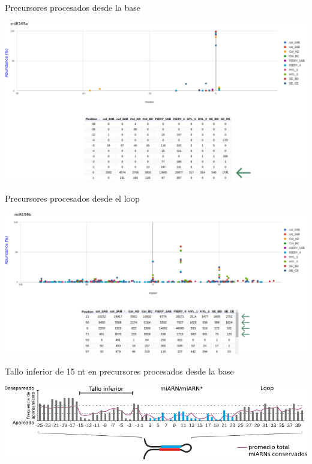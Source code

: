 \documentclass{beamer}
\begin{document}
\begin{frame}{Precursores procesados desde la base}
	\begin{center}
		\includegraphics[width=1\textwidth]{img/miR165a_SPARE.png}
	\end{center}
\end{frame}

\begin{frame}{Precursores procesados desde el loop}
	\begin{center}
		\includegraphics[width=1\textwidth]{img/miR159b_SPARE.png}
	\end{center}
\end{frame}

\begin{frame}{Tallo inferior de 15 nt en precursores procesados desde la base}
	\begin{center}
		\includegraphics[width=.8\textwidth]{img/GR_fig2C.png}
	\end{center}
\end{frame}
\end{document}
